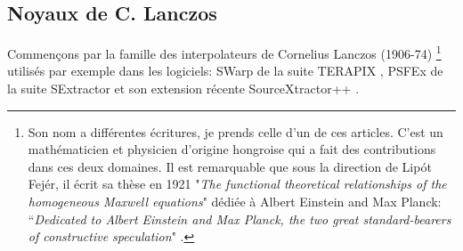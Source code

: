 \documentclass[11pt,twoside]{article}
\begin{document}
\subsection{Noyaux de C. Lanczos}
\label{sec:Lanczos}
%
Commençons par la famille des interpolateurs de Cornelius Lanczos (1906-74) \footnote{Son nom a différentes écritures, je prends celle d'un de ces articles. C'est un mathématicien et physicien d'origine hongroise qui a fait des contributions dans ces deux domaines. Il est remarquable que sous la direction de Lipót Fejér, il écrit sa thèse en 1921 "\textit{The functional theoretical relationships of the homogeneous Maxwell equations}" dédiée à Albert Einstein and Max Planck: “\textit{Dedicated to Albert Einstein and Max Planck, the two great standard-bearers of constructive speculation}" \citep{lanczos2004relations}.} utilisés par exemple dans les logiciels: \textsf{SWarp} de la suite \textsf{TERAPIX} \citep{2002ASPC..281..228B}, \textsf{PSFEx} de la suite \textsf{SExtractor} \citep{1996A&AS..117..393B, 2011ASPC..442..435B} et son extension récente \textsf{SourceXtractor++} \citep{2022arXiv221202428K}.
\end{document}

